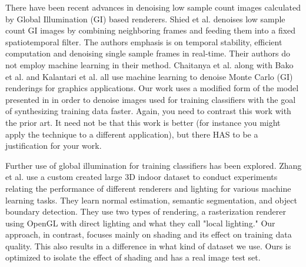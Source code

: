 \documentclass[10pt,twocolumn,letterpaper]{article}
\begin{document}

There have been recent advances in denoising low sample count images calculated by Global Illumination (GI) based renderers.
Shied et al. \cite{Schied:2017:SVF:3105762.3105770} denoises low sample count GI images by combining neighboring frames and feeding them into a fixed spatiotemporal filter.  The authors emphasis is on temporal stability, efficient computation and denoising single sample frames in real-time. Their authors do not employ machine learning in their method. 
Chaitanya et al. \cite{Chaitanya:2017:IRM:3072959.3073601} along with 
Bako et al. \cite{Bako17} and 
Kalantari et al. \cite{Kalantari:2015:MLA:2809654.2766977} all use machine learning to denoise Monte Carlo (GI) renderings for graphics applications.  Our work uses a modified form of the model presented in \cite{Chaitanya:2017:IRM:3072959.3073601} in order to denoise images used for training classifiers with the goal of synthesizing training data faster. Again, you need to contrast this work with the prior art. It need not be that this work is better (for instance you might apply the technique to a different application), but there HAS to be a justification for your work.

Further use of global illumination for training classifiers has been explored.
Zhang et al. \cite{DBLP:journals/corr/ZhangSYSLJF16} use a custom created large 3D indoor dataset to conduct experiments relating the performance of different renderers and lighting for various machine learning tasks. They learn normal estimation, semantic segmentation, and object boundary detection. They use two types of rendering, a rasterization renderer using OpenGL with direct lighting and what they call "local lighting." Our approach, in contrast, focuses mainly on shading and its effect on training data quality. This also results in a difference in what kind of dataset we use. Ours is optimized to isolate the effect of shading and has a real image test set.
\end{document}
